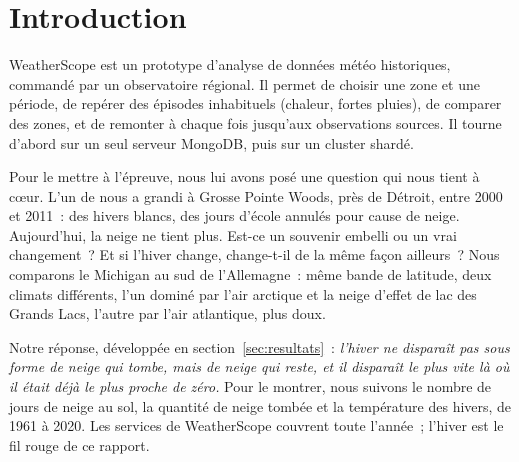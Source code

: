 \section{Introduction}

WeatherScope est un prototype d'analyse de données météo historiques, commandé par un observatoire régional. Il permet de choisir une zone et une période, de repérer des épisodes inhabituels (chaleur, fortes pluies), de comparer des zones, et de remonter à chaque fois jusqu'aux observations sources. Il tourne d'abord sur un seul serveur MongoDB, puis sur un cluster shardé.

Pour le mettre à l'épreuve, nous lui avons posé une question qui nous tient à cœur. L'un de nous a grandi à Grosse Pointe Woods, près de Détroit, entre 2000 et 2011~: des hivers blancs, des jours d'école annulés pour cause de neige. Aujourd'hui, la neige ne tient plus. Est-ce un souvenir embelli ou un vrai changement~? Et si l'hiver change, change-t-il de la même façon ailleurs~? Nous comparons le Michigan au sud de l'Allemagne~: même bande de latitude, deux climats différents, l'un dominé par l'air arctique et la neige d'effet de lac des Grands Lacs, l'autre par l'air atlantique, plus doux.

Notre réponse, développée en section~\ref{sec:resultats}~: \emph{l'hiver ne disparaît pas sous forme de neige qui tombe, mais de neige qui reste, et il disparaît le plus vite là où il était déjà le plus proche de zéro.} Pour le montrer, nous suivons le nombre de jours de neige au sol, la quantité de neige tombée et la température des hivers, de 1961 à 2020. Les services de WeatherScope couvrent toute l'année~; l'hiver est le fil rouge de ce rapport.

